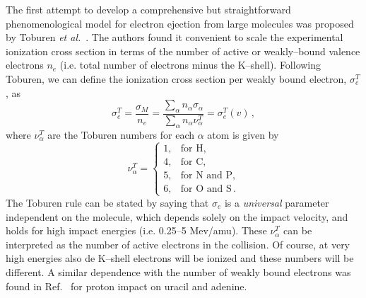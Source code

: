 \documentclass[preprint,12pt]{article}
\begin{document}
The first attempt to develop a comprehensive but straightforward 
phenomenological model for electron ejection from large molecules was 
proposed by Toburen {\it et al.}~\cite{toburen1975,toburen1976}. 
The authors found it convenient to scale the experimental ionization 
cross section in terms of the number of active or weakly--bound valence 
electrons $n_e$ (i.e. total number of electrons minus the K--shell).
Following Toburen, we can define the ionization cross section per weakly 
bound electron, $\sigma_{e}^T$, as
\begin{equation}
\sigma_{e}^T=\frac{\sigma_{M}}{n_e}=\frac{\sum\limits_{\alpha}
n_{\alpha}\sigma_{\alpha}}{\sum\limits_{\alpha}n_{\alpha}\nu_{\alpha}^T}
=\sigma_{e}^T(v)\,, 
\label{27} 
\end{equation}
where $\nu_{\alpha}^T$ are the Toburen numbers for each $\alpha$ atom 
is given by
\begin{equation}
\nu_{\alpha}^T=\left\{ 
\begin{array}{ll}
1, & \text{for H,} \\
4, & \text{for C,} \\ 
5, & \text{for N and P,} \\ 
6, & \text{for O and S}\,.
\end{array}\right.
\label{eq:nelec} 
\end{equation} 
The Toburen rule can be stated by saying that 
$\sigma_{e}$ is a \textit{universal} parameter independent on the 
molecule, which depends solely on the impact velocity, and holds for 
high impact energies (i.e. 0.25--5 Mev/amu).
These $\nu_{\alpha}^T$ can be interpreted as the number of active 
electrons in the collision. Of course, at very high energies also de 
K--shell electrons will be ionized and these numbers will be different.
A similar dependence with the number of weakly bound electrons was 
found in Ref.~\cite{itoh2013} for proton impact on uracil and adenine.
\end{document}
